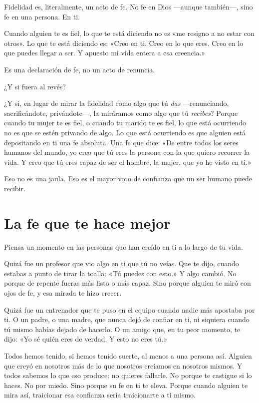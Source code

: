 Fidelidad es, literalmente, un acto de fe. No fe en Dios ---aunque también---, sino fe en una persona. En ti.

Cuando alguien te es fiel, lo que te está diciendo no es «me resigno a no estar con otros». Lo que te está diciendo es: «Creo en ti. Creo en lo que eres. Creo en lo que puedes llegar a ser. Y apuesto mi vida entera a esa creencia.»

Es una declaración de fe, no un acto de renuncia.

¿Y si fuera al revés?

¿Y si, en lugar de mirar la fidelidad como algo que tú \emph{das} ---renunciando, sacrificándote, privándote---, la miráramos como algo que tú \emph{recibes}? Porque cuando tu mujer te es fiel, o cuando tu marido te es fiel, lo que está ocurriendo no es que se estén privando de algo. Lo que está ocurriendo es que alguien está depositando en ti una fe absoluta. Una fe que dice: «De entre todos los seres humanos del mundo, yo creo que tú eres la persona con la que quiero recorrer la vida. Y creo que tú eres capaz de ser el hombre, la mujer, que yo he visto en ti.»

Eso no es una jaula. Eso es el mayor voto de confianza que un ser humano puede recibir.

\section{La fe que te hace mejor}

Piensa un momento en las personas que han creído en ti a lo largo de tu vida.

Quizá fue un profesor que vio algo en ti que tú no veías. Que te dijo, cuando estabas a punto de tirar la toalla: «Tú puedes con esto.» Y algo cambió. No porque de repente fueras más listo o más capaz. Sino porque alguien te miró con ojos de fe, y esa mirada te hizo crecer.

Quizá fue un entrenador que te puso en el equipo cuando nadie más apostaba por ti. O un padre, o una madre, que nunca dejó de confiar en ti, ni siquiera cuando tú mismo habías dejado de hacerlo. O un amigo que, en tu peor momento, te dijo: «Yo sé quién eres de verdad. Y esto no eres tú.»

Todos hemos tenido, si hemos tenido suerte, al menos a una persona así. Alguien que creyó en nosotros más de lo que nosotros creíamos en nosotros mismos. Y todos sabemos lo que eso produce: no quieres fallarle. No porque te castigue si lo haces. No por miedo. Sino porque su fe en ti te eleva. Porque cuando alguien te mira así, traicionar esa confianza sería traicionarte a ti mismo.

